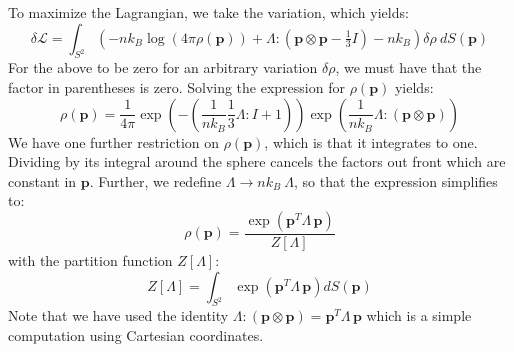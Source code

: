 \documentclass[reqno]{article}
\begin{document}
  To maximize the Lagrangian, we take the variation, which yields:
  \begin{equation}
    \delta \mathcal{L}
    =
    \int_{S^2} \left(
      -n k_B \log \left( 4 \pi \rho(\mathbf{p}) \right)
      + \Lambda : (\mathbf{p} \otimes \mathbf{p} - \tfrac13 I)
      - n k_B
    \right) \delta \rho \: dS(\mathbf{p})
  \end{equation}
  For the above to be zero for an arbitrary variation $\delta \rho$, we must have
  that the factor in parentheses is zero.
  Solving the expression for $\rho(\mathbf{p})$ yields:
  \begin{equation}
    \rho(\mathbf{p})
    =
    \frac{1}{4\pi}
    \exp \left(
      -\left(\frac{1}{n k_B} \frac13 \Lambda : I + 1\right)
    \right)
    \exp \left(
      \frac{1}{n k_B} \Lambda : (\mathbf{p} \otimes \mathbf{p})
    \right)
  \end{equation}
  We have one further restriction on $\rho(\mathbf{p})$, which is that it integrates to
  one.
  Dividing by its integral around the sphere cancels the factors out front which
  are constant in $\mathbf{p}$.
  Further, we redefine $\Lambda \to n k_B \: \Lambda$, so that the expression
  simplifies to:
  \begin{equation}
    \rho(\mathbf{p})
    =
    \frac{\exp \left( \mathbf{p}^T \Lambda \, \mathbf{p} \right)}{Z[\Lambda]}
  \end{equation}
  with the partition function $Z[\Lambda]$:
  \begin{equation}
    Z[\Lambda] = \int_{S^2} \exp \left( \mathbf{p}^T \Lambda \, \mathbf{p} \right) dS(\mathbf{p})
  \end{equation}
  Note that we have used the identity $\Lambda : (\mathbf{p} \otimes \mathbf{p}) = \mathbf{p}^T
  \Lambda \, \mathbf{p}$ which is a simple computation using Cartesian coordinates.
\end{document}
